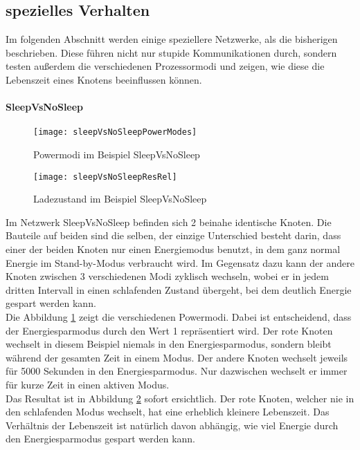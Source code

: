 \subsection*{spezielles Verhalten}

Im folgenden Abschnitt werden einige speziellere Netzwerke, als die bisherigen beschrieben. Diese führen nicht nur stupide Kommunikationen durch, sondern testen außerdem die verschiedenen Prozessormodi und zeigen, wie diese die Lebenszeit eines Knotens beeinflussen können.

\paragraph{SleepVsNoSleep}

\begin{figure}[htbp]
\centering
\caption{Powermodi im Beispiel SleepVsNoSleep}
\label{fig:sleepVsNoSleepPowerModes}
\texttt{[image: sleepVsNoSleepPowerModes]}
\end{figure}

\begin{figure}[htbp]
\centering
\caption{Ladezustand im Beispiel SleepVsNoSleep}
\label{fig:sleepVsNoSleepResRel}
\texttt{[image: sleepVsNoSleepResRel]}
\end{figure}

Im Netzwerk SleepVsNoSleep befinden sich 2 beinahe identische Knoten. Die Bauteile auf beiden sind die selben, der einzige Unterschied besteht darin, dass einer der beiden Knoten nur einen Energiemodus benutzt, in dem ganz normal Energie im Stand-by-Modus verbraucht wird. Im Gegensatz dazu kann der andere Knoten zwischen 3 verschiedenen Modi zyklisch wechseln, wobei er in jedem dritten Intervall in einen schlafenden Zustand übergeht, bei dem deutlich Energie gespart werden kann.\\
Die Abbildung \ref{fig:sleepVsNoSleepPowerModes} zeigt die verschiedenen Powermodi. Dabei ist entscheidend, dass der Energiesparmodus durch den Wert 1 repräsentiert wird. Der rote Knoten wechselt in diesem Beispiel niemals in den Energiesparmodus, sondern bleibt während der gesamten Zeit in einem Modus. Der andere Knoten wechselt jeweils für 5000 Sekunden in den Energiesparmodus. Nur dazwischen wechselt er immer für kurze Zeit in einen aktiven Modus.\\
Das Resultat ist in Abbildung \ref{fig:sleepVsNoSleepResRel} sofort ersichtlich. Der rote Knoten, welcher nie in den schlafenden Modus wechselt, hat eine erheblich kleinere Lebenszeit. Das Verhältnis der Lebenszeit ist natürlich davon abhängig, wie viel Energie durch den Energiesparmodus gespart werden kann.

